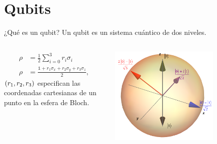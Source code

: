 \documentclass[xcolor=dvipsnames,presentation]{beamer}%
\begin{document}

\section{Qubits}

\begin{frame}{¿Qué es un qubit?}
	Un qubit es un sistema cuántico de dos niveles.
	
	\begin{columns}
	\hspace{1cm}
	\begin{column}{0.7\textwidth}
		\begin{align*}
			\rho &= \frac{1}{2}\sum _{i=0}^3 r_i\sigma_i \\
			\rho &= \frac{\mathds{1}+r_1\sigma_x+r_2\sigma_y+r_3\sigma_z}{2},
		\end{align*}	
		$\qty(r_1,r_2,r_3)$ especifican las coordenadas cartesianas de un 
 		punto en la esfera de Bloch.
	\end{column}\hspace{-1cm}
	\begin{column}{0.5\textwidth}  %
  		\begin{center}
    		\includegraphics[width=0.7\textwidth]{images/bloch}      
     \end{center}
		\end{column}
	\end{columns}
\end{frame}
\end{document}
